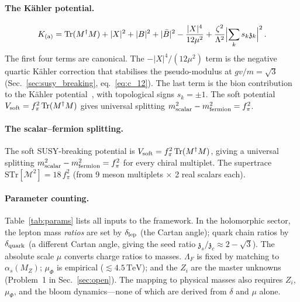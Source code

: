 \documentclass[aps,prd,twocolumn,showpacs,preprintnumbers,superscriptaddress,floatfix]{revtex4-2}
\newcommand{\Tr}{\mathrm{Tr}}
\newcommand{\TeV}{\,\mathrm{TeV}}
\newcommand{\zch}{\mathfrak{z}}
\begin{document}
\paragraph{The K\"ahler potential.}
\begin{equation}
  K_{\rm (a)} = \Tr(M^\dagger M) + |X|^2 + |B|^2 + |\bar{B}|^2
  - \frac{|X|^4}{12\mu^2}
  + \frac{\zeta^2}{\Lambda^2}
    \Bigl|\sum_k s_k \zch_k\Bigr|^2\,.
  \label{eq:Kahler_a}
\end{equation}
The first four terms are canonical.
The $-|X|^4/(12\mu^2)$ term is the negative quartic K\"ahler
correction that stabilises the pseudo-modulus at $gv/m = \sqrt{3}$
(Sec.~\ref{sec:susy_breaking}, eq.~\eqref{eq:c_12}).
The last term is the bion contribution to the K\"ahler
potential~\cite{Unsal:2008}, with topological signs
$s_k = \pm 1$.
The soft potential $V_{\rm soft} = f_\pi^2\,\Tr(M^\dagger M)$
gives universal splitting
$m^2_{\rm scalar} - m^2_{\rm fermion} = f_\pi^2$.

\paragraph{The scalar--fermion splitting.}
The soft SUSY-breaking potential is
$V_{\rm soft} = f_\pi^2\,\Tr(M^\dagger M)$,
giving a universal splitting
$m^2_{\rm scalar} - m^2_{\rm fermion} = f_\pi^2$ for every
chiral multiplet.
The supertrace
$\mathrm{STr}[\mathcal{M}^2] = 18\,f_\pi^2$
(from 9 meson multiplets $\times$ 2 real scalars each).

\paragraph{Parameter counting.}
Table~\ref{tab:params} lists all inputs to the framework.
In the holomorphic sector, the lepton mass
\emph{ratios} are set by $\delta_{\rm lep}$ (the Cartan angle);
quark chain ratios by $\delta_{\rm quark}$
(a different Cartan angle, giving the seed ratio
$\zch_s/\zch_c \approx 2 - \sqrt{3}$).
The absolute scale $\mu$ converts charge ratios to masses.
$\Lambda_F$ is fixed by matching to $\alpha_s(M_Z)$;
$\mu_\Phi$ is empirical ($\lesssim 4.5\TeV$); and the $Z_i$
are the master unknowns (Problem~1 in Sec.~\ref{sec:open}).
The mapping to physical masses also requires $Z_i$,
$\mu_\Phi$, and the bloom dynamics---none of which are derived
from $\delta$ and $\mu$ alone.
\end{document}
